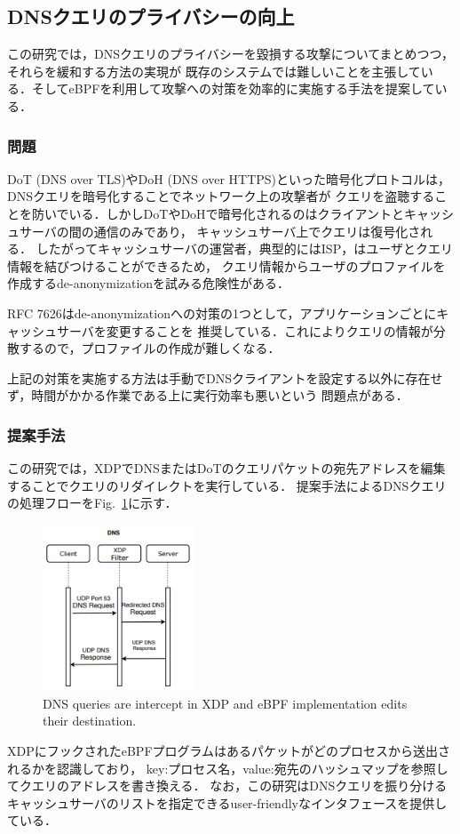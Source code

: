 \documentclass[platex,a4j,10pt,twoside,twocolumn,dvipdfmx]{jsarticle}
\newcommand{\Fref}[1]{Fig.~\ref{#1}}
\begin{document}
  \subsection{DNSクエリのプライバシーの向上 \cite{rivera2020leveraging}}
  この研究では，DNSクエリのプライバシーを毀損する攻撃についてまとめつつ，それらを緩和する方法の実現が
  既存のシステムでは難しいことを主張している．そしてeBPFを利用して攻撃への対策を効率的に実施する手法を提案している．
  
  \subsubsection{問題}
  DoT (DNS over TLS)やDoH (DNS over HTTPS)といった暗号化プロトコルは，DNSクエリを暗号化することでネットワーク上の攻撃者が
  クエリを盗聴することを防いでいる．しかしDoTやDoHで暗号化されるのはクライアントとキャッシュサーバの間の通信のみであり，
  キャッシュサーバ上でクエリは復号化される．
  したがってキャッシュサーバの運営者，典型的にはISP，はユーザとクエリ情報を結びつけることができるため，
  クエリ情報からユーザのプロファイルを作成するde-anonymizationを試みる危険性がある．
  
  RFC 7626はde-anonymizationへの対策の1つとして，アプリケーションごとにキャッシュサーバを変更することを
  推奨している．これによりクエリの情報が分散するので，プロファイルの作成が難しくなる．
  
  上記の対策を実施する方法は手動でDNSクライアントを設定する以外に存在せず，時間がかかる作業である上に実行効率も悪いという
  問題点がある．
  
  \subsubsection{提案手法}
  この研究では，XDPでDNSまたはDoTのクエリパケットの宛先アドレスを編集することでクエリのリダイレクトを実行している．
  提案手法によるDNSクエリの処理フローを\Fref{img:dns-process}に示す．
  \begin{figure}[tp]
    \begin{center}
      \includegraphics[width=45mm]{./img/dns-process.png}
    \end{center}
    \caption{DNS queries are intercept in XDP and eBPF implementation edits their destination. \cite{rivera2020leveraging}}
    \label{img:dns-process}
  \end{figure}
  XDPにフックされたeBPFプログラムはあるパケットがどのプロセスから送出されるかを認識しており，
  key:プロセス名，value:宛先のハッシュマップを参照してクエリのアドレスを書き換える．
  なお，この研究はDNSクエリを振り分けるキャッシュサーバのリストを指定できるuser-friendlyなインタフェースを提供している．
  
\end{document}
